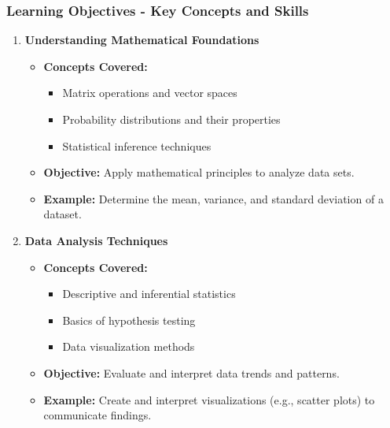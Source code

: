 \documentclass[aspectratio=169]{beamer}
\begin{document}
\begin{frame}[fragile]
    \frametitle{Learning Objectives - Key Concepts and Skills}
    \begin{enumerate}
        \item \textbf{Understanding Mathematical Foundations}
        \begin{itemize}
            \item \textbf{Concepts Covered:}
            \begin{itemize}
                \item Matrix operations and vector spaces
                \item Probability distributions and their properties
                \item Statistical inference techniques
            \end{itemize}
            \item \textbf{Objective:} Apply mathematical principles to analyze data sets.
            \item \textbf{Example:} Determine the mean, variance, and standard deviation of a dataset.
        \end{itemize}

        \item \textbf{Data Analysis Techniques}
        \begin{itemize}
            \item \textbf{Concepts Covered:}
            \begin{itemize}
                \item Descriptive and inferential statistics
                \item Basics of hypothesis testing
                \item Data visualization methods
            \end{itemize}
            \item \textbf{Objective:} Evaluate and interpret data trends and patterns.
            \item \textbf{Example:} Create and interpret visualizations (e.g., scatter plots) to communicate findings.
        \end{itemize}
    \end{enumerate}
\end{frame}
\end{document}
